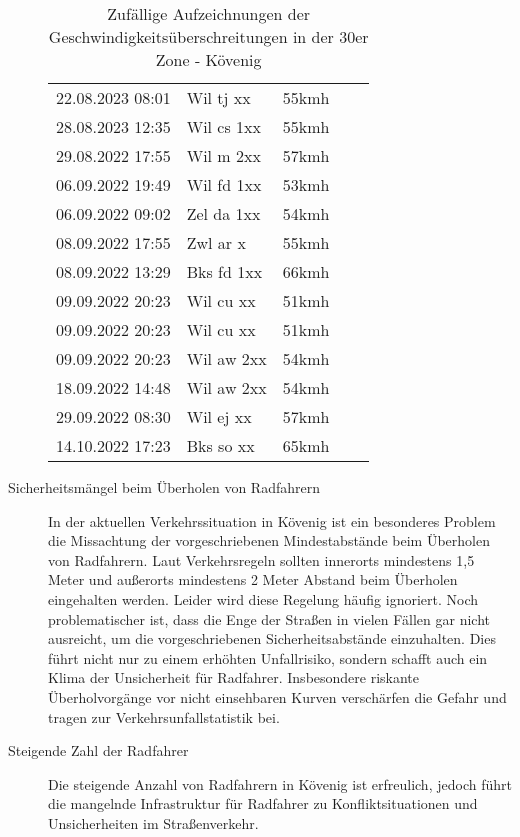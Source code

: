 \begin{description}
\begin{table}[htbp]
\begin{tabular}{lllll}
 22.08.2023 08:01 & Wil tj xx & 55kmh \\
 28.08.2023 12:35 & Wil cs 1xx & 55kmh \\
 29.08.2022 17:55 & Wil m 2xx & 57kmh \\
 06.09.2022 19:49 & Wil fd 1xx & 53kmh \\
 06.09.2022 09:02 & Zel da 1xx & 54kmh \\
 08.09.2022 17:55 & Zwl ar x & 55kmh \\
 08.09.2022 13:29 & Bks fd 1xx & 66kmh \\
 09.09.2022 20:23 & Wil cu xx & 51kmh \\
 09.09.2022 20:23 & Wil cu xx & 51kmh \\
 09.09.2022 20:23 & Wil aw 2xx & 54kmh \\
 18.09.2022 14:48 & Wil aw 2xx & 54kmh \\
 29.09.2022 08:30 & Wil ej xx & 57kmh \\
 14.10.2022 17:23 & Bks so xx & 65kmh \\

		\bottomrule
	\end{tabular}
	\caption{Zufällige Aufzeichnungen der Geschwindigkeitsüberschreitungen in der 30er Zone - Kövenig}
	
	\label{table:geschw}
	
\end{table}

\item[Sicherheitsmängel beim Überholen von Radfahrern] In der aktuellen Verkehrssituation in Kövenig ist ein besonderes Problem die Missachtung der vorgeschriebenen Mindestabstände beim Überholen von Radfahrern. Laut Verkehrsregeln sollten innerorts mindestens 1,5 Meter und außerorts mindestens 2 Meter Abstand beim Überholen eingehalten werden. Leider wird diese Regelung häufig ignoriert. Noch problematischer ist, dass die Enge der Straßen in vielen Fällen gar nicht ausreicht, um die vorgeschriebenen Sicherheitsabstände einzuhalten. Dies führt nicht nur zu einem erhöhten Unfallrisiko, sondern schafft auch ein Klima der Unsicherheit für Radfahrer. Insbesondere riskante Überholvorgänge vor nicht einsehbaren Kurven verschärfen die Gefahr und tragen zur Verkehrsunfallstatistik bei.

  \item[Steigende Zahl der Radfahrer]
  Die steigende Anzahl von Radfahrern in Kövenig ist erfreulich, jedoch führt die mangelnde Infrastruktur für Radfahrer zu Konfliktsituationen und Unsicherheiten im Straßenverkehr.


\end{description}

